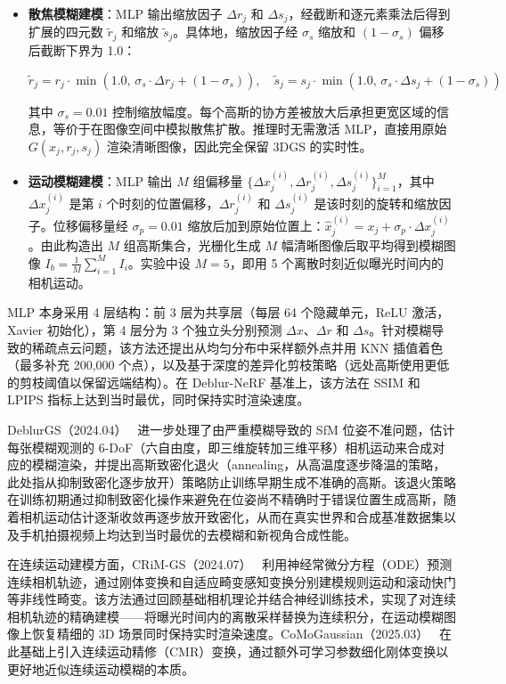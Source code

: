 \begin{itemize}
\item \textbf{散焦模糊建模}：MLP 输出缩放因子 $\Delta r_j$ 和 $\Delta s_j$，经截断和逐元素乘法后得到扩展的四元数 $\tilde{r}_j$ 和缩放 $\tilde{s}_j$。具体地，缩放因子经 $\sigma_s$ 缩放和 $(1-\sigma_s)$ 偏移后截断下界为 1.0：

\begin{equation}
\tilde{r}_j = r_j \cdot \min(1.0,\, \sigma_s \cdot \Delta r_j + (1-\sigma_s)), \quad \tilde{s}_j = s_j \cdot \min(1.0,\, \sigma_s \cdot \Delta s_j + (1-\sigma_s))
\end{equation}

其中 $\sigma_s = 0.01$ 控制缩放幅度。每个高斯的协方差被放大后承担更宽区域的信息，等价于在图像空间中模拟散焦扩散。推理时无需激活 MLP，直接用原始 $G(x_j, r_j, s_j)$ 渲染清晰图像，因此完全保留 3DGS 的实时性。
\item \textbf{运动模糊建模}：MLP 输出 $M$ 组偏移量 $\{\Delta x_j^{(i)}, \Delta r_j^{(i)}, \Delta s_j^{(i)}\}_{i=1}^{M}$，其中 $\Delta x_j^{(i)}$ 是第 $i$ 个时刻的位置偏移，$\Delta r_j^{(i)}$ 和 $\Delta s_j^{(i)}$ 是该时刻的旋转和缩放因子。位移偏移量经 $\sigma_p = 0.01$ 缩放后加到原始位置上：$\hat{x}_j^{(i)} = x_j + \sigma_p \cdot \Delta x_j^{(i)}$。由此构造出 $M$ 组高斯集合，光栅化生成 $M$ 幅清晰图像后取平均得到模糊图像 $I_b = \frac{1}{M}\sum_{i=1}^{M} I_i$。实验中设 $M=5$，即用 5 个离散时刻近似曝光时间内的相机运动。
\end{itemize}

MLP 本身采用 4 层结构：前 3 层为共享层（每层 64 个隐藏单元，ReLU 激活，Xavier 初始化），第 4 层分为 3 个独立头分别预测 $\Delta x$、$\Delta r$ 和 $\Delta s$。针对模糊导致的稀疏点云问题，该方法还提出从均匀分布中采样额外点并用 KNN 插值着色（最多补充 200,000 个点），以及基于深度的差异化剪枝策略（远处高斯使用更低的剪枝阈值以保留远端结构）。在 Deblur-NeRF 基准上，该方法在 SSIM 和 LPIPS 指标上达到当时最优，同时保持实时渲染速度。

DeblurGS（2024.04）~\cite{2404_11358} 进一步处理了由严重模糊导致的 SfM 位姿不准问题，估计每张模糊观测的 6-DoF（六自由度，即三维旋转加三维平移）相机运动来合成对应的模糊渲染，并提出高斯致密化退火（annealing，从高温度逐步降温的策略，此处指从抑制致密化逐步放开）策略防止训练早期生成不准确的高斯。该退火策略在训练初期通过抑制致密化操作来避免在位姿尚不精确时于错误位置生成高斯，随着相机运动估计逐渐收敛再逐步放开致密化，从而在真实世界和合成基准数据集以及手机拍摄视频上均达到当时最优的去模糊和新视角合成性能。

在连续运动建模方面，CRiM-GS（2024.07）~\cite{2407_03923} 利用神经常微分方程（ODE）预测连续相机轨迹，通过刚体变换和自适应畸变感知变换分别建模规则运动和滚动快门等非线性畸变。该方法通过回顾基础相机理论并结合神经训练技术，实现了对连续相机轨迹的精确建模——将曝光时间内的离散采样替换为连续积分，在运动模糊图像上恢复精细的 3D 场景同时保持实时渲染速度。CoMoGaussian（2025.03）~\cite{2503_05332} 在此基础上引入连续运动精修（CMR）变换，通过额外可学习参数细化刚体变换以更好地近似连续运动模糊的本质。

